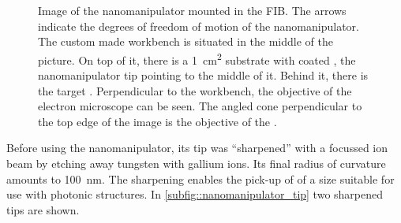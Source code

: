 		\begin{figure}[htp]
				\centering
				\label{fig::nanomanipulator_image}
			\caption[Nanomanipulator in a SEM setup]{Image of the nanomanipulator mounted in the FIB. The arrows indicate the degrees of freedom of motion of the nanomanipulator. The custom made workbench is situated in the middle of the picture. On top of it, there is a \SI{1}{\centi\meter\squared} substrate with coated \nds, the nanomanipulator tip pointing to the middle of it. Behind it, there is the target \vcsel. Perpendicular to the workbench, the objective of the electron microscope can be seen. The angled cone perpendicular to the top edge of the image is the objective of the \fib.}
		\end{figure}

		Before using the nanomanipulator, its tip was ``sharpened'' with a focussed ion beam by etching away tungsten with gallium ions. Its final radius of curvature amounts to \SI{100}{\nano\meter}. The sharpening enables the pick-up of \nds of a size suitable for use with photonic structures.
		In \autoref{subfig::nanomanipulator_tip} two sharpened tips are shown.

